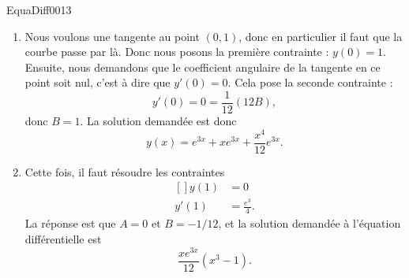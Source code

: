 \begin{corrige}{EquaDiff0013}
\begin{enumerate}
\begin{enumerate}
				\item
					Nous voulons une tangente au point $(0,1)$, donc en particulier il faut que la courbe passe par là. Donc nous posons la première contrainte : $y(0)=1$. Ensuite, nous demandons que le coefficient angulaire de la tangente en ce point soit nul, c'est à dire que $y'(0)=0$. Cela pose la seconde contrainte : 
					\begin{equation}
						y'(0)=0=\frac{ 1 }{ 12 }(12B), 
					\end{equation}
					donc $B=1$. La solution demandée est donc
					\begin{equation}
						y(x)= e^{3x}+x e^{3x}+\frac{ x^4 }{ 12 } e^{3x}.
					\end{equation}

				\item
					Cette fois, il faut résoudre les contraintes
					\begin{equation}
						\begin{aligned}[]
							y(1)&=0\\
							y'(1)&=\frac{ e^3 }{ 4 }.
						\end{aligned}
					\end{equation}
					La réponse est que $A=0$ et $B=-1/12$, et la solution demandée à l'équation différentielle est
					\begin{equation}
						\frac{ x e^{3x} }{ 12 }(x^3-1).
					\end{equation}
			\end{enumerate}
	\end{enumerate}
\end{corrige}
